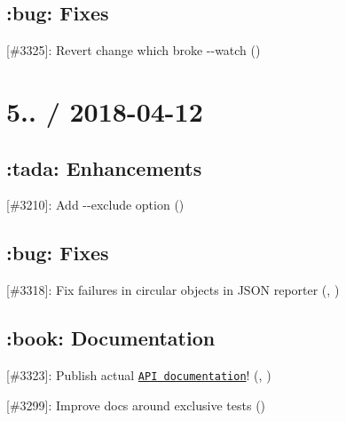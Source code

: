 \subsection*{\+:bug\+: Fixes}


\begin{DoxyItemize}
\item \mbox{[}\#3325\mbox{]}\+: Revert change which broke {\ttfamily -\/-\/watch} (\href{https://github.com/boneskull}{\tt })
\end{DoxyItemize}

\section*{5.. / 2018-\/04-\/12}

\subsection*{\+:tada\+: Enhancements}


\begin{DoxyItemize}
\item \mbox{[}\#3210\mbox{]}\+: Add {\ttfamily -\/-\/exclude} option (\href{https://github.com/metalex9}{\tt })
\end{DoxyItemize}

\subsection*{\+:bug\+: Fixes}


\begin{DoxyItemize}
\item \mbox{[}\#3318\mbox{]}\+: Fix failures in circular objects in J\+S\+ON reporter (\href{https://github.com/jeversmann}{\tt }, \href{https://github.com/boneskull}{\tt })
\end{DoxyItemize}

\subsection*{\+:book\+: Documentation}


\begin{DoxyItemize}
\item \mbox{[}\#3323\mbox{]}\+: Publish actual \href{https://mochajs.org/api/}{\tt A\+PI documentation}! (\href{https://github.com/dfberry}{\tt }, \href{https://github.com/munter}{\tt })
\item \mbox{[}\#3299\mbox{]}\+: Improve docs around exclusive tests (\href{https://github.com/nicgirault}{\tt })
\end{DoxyItemize}

